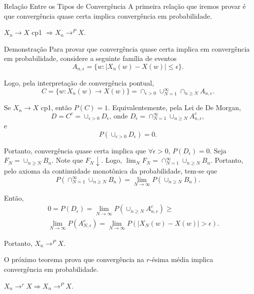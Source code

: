 \begin{frame}{Relação Entre os Tipos de Convergência}
%
A primeira relação que iremos provar é que convergência quase certa
implica convergência em probabilidade.
%
\begin{teo} \label{cp1prob}
$X_n\rightarrow X$ cp1 $\Rightarrow X_n\rightarrow^P X$.
\end{teo}
%
%
\begin{block}{Demonstração}
%
%
Para provar que convergência quase certa implica em
convergência em probabilidade, considere a seguinte família de
eventos
$$A_{n,\epsilon}=\{w:|X_n(w)-X(w)|\leq \epsilon\}.$$

Logo, pela interpretação de convergência pontual,
$$C=\{w:X_n(w)\rightarrow X(w)\}=\cap_{\epsilon>0}\cup_{N=1}^{\infty}\cap_{n\geq N}A_{n,\epsilon}.$$

Se $X_n\rightarrow X$ cp1, então $P(C)=1$. Equivalentemente, pela
Lei de De Morgan,
$$D=C^c=\cup_{\epsilon>0}D_{\epsilon}\mbox{, onde }D_{\epsilon}=\cap_{N=1}^{\infty}\cup_{n\geq N}A_{n,\epsilon}^c,$$
e
$$P(\cup_{\epsilon>0}D_{\epsilon})=0.$$
%
\end{block}
\end{frame}
%
\begin{frame}
\begin{block}{}
%
%
Portanto, convergência quase certa implica que $\forall\epsilon>0$,
$P(D_{\epsilon})=0$. Seja $F_N=\cup_{n\geq N}B_n$. Note que $F_N\downarrow$. Logo, $\lim_N F_N=\cap_{N=1}^{\infty}\cup_{n\geq N}B_n$. Portanto, pelo axioma da continuidade monotônica da
probabilidade, tem-se que
$$P(\cap_{N=1}^{\infty}\cup_{n\geq N}B_n)=\lim_{N\rightarrow\infty}P(\cup_{n\geq N}B_n).$$

Então,
\begin{eqnarray}
& & 0=P(D_{\epsilon})=\lim_{N\rightarrow\infty}P(\cup_{n\geq
N}A_{n,\epsilon}^c)\geq \nonumber
\\
& & \lim_{N\rightarrow\infty}P(A_{N,\epsilon}^c)=
\lim_{N\rightarrow\infty}P(|X_N(w)-X(w)|>\epsilon). \nonumber
\end{eqnarray}

Portanto, $X_n\rightarrow^P X$.
%
\end{block}
%
%
%
%
O próximo teorema prova que convergência na $r$-ésima média implica
convergência em probabilidade.
%
\begin{teo}
$X_n\rightarrow^r X \Rightarrow X_n\rightarrow^P X$.
\end{teo}
%
\end{frame}
